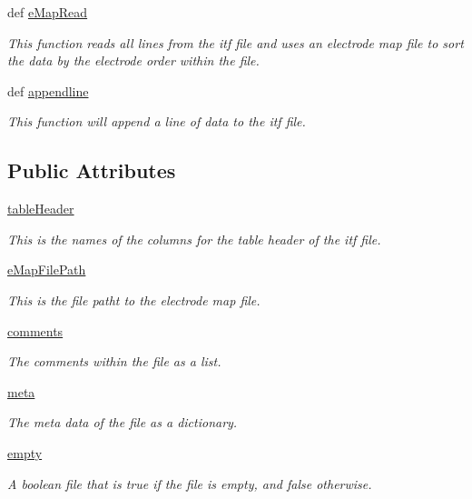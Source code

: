 \begin{DoxyCompactItemize}
def \hyperlink{classitf_parser_1_1itf_parser_ab702c464a6816e9874305b94cd78f862}{e\-Map\-Read}
\begin{DoxyCompactList}\small\item\em This function reads all lines from the itf file and uses an electrode map file to sort the data by the electrode order within the file. \end{DoxyCompactList}\item 
def \hyperlink{classitf_parser_1_1itf_parser_a148fe1022d9ad5ff61276243c2112fa3}{appendline}
\begin{DoxyCompactList}\small\item\em This function will append a line of data to the itf file. \end{DoxyCompactList}\end{DoxyCompactItemize}
\subsection*{Public Attributes}
\begin{DoxyCompactItemize}
\item 
\hyperlink{classitf_parser_1_1itf_parser_a3af398778ebdb14a94e1b0da2cc1c9cd}{table\-Header}
\begin{DoxyCompactList}\small\item\em This is the names of the columns for the table header of the itf file. \end{DoxyCompactList}\item 
\hyperlink{classitf_parser_1_1itf_parser_a48bb3ccf340622586bc45a2c003df40a}{e\-Map\-File\-Path}
\begin{DoxyCompactList}\small\item\em This is the file patht to the electrode map file. \end{DoxyCompactList}\item 
\hyperlink{classitf_parser_1_1itf_parser_ab7f889a0dc7be9cbecf57d072a9daf46}{comments}
\begin{DoxyCompactList}\small\item\em The comments within the file as a list. \end{DoxyCompactList}\item 
\hyperlink{classitf_parser_1_1itf_parser_ac67cf5edcc9d174a9f212ae6a55a651c}{meta}
\begin{DoxyCompactList}\small\item\em The meta data of the file as a dictionary. \end{DoxyCompactList}\item 
\hyperlink{classitf_parser_1_1itf_parser_a1a239520970f218dc3731c17ebed8815}{empty}
\begin{DoxyCompactList}\small\item\em A boolean file that is true if the file is empty, and false otherwise. \end{DoxyCompactList}\end{DoxyCompactItemize}
